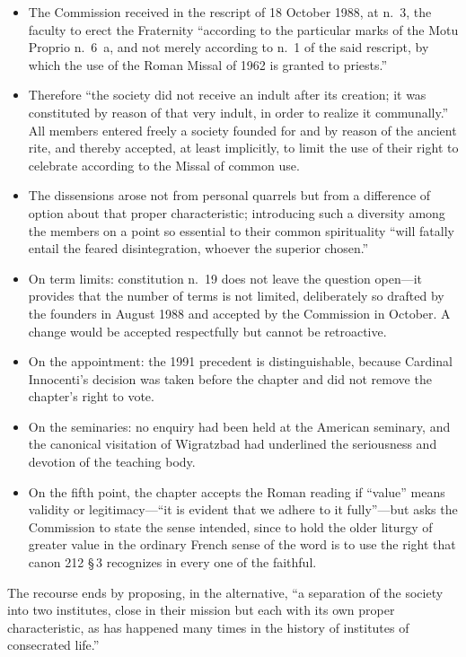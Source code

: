 \begin{itemize}
\item The Commission received in the rescript  of 18 October 1988, at n.~3, the faculty to erect the Fraternity
``according to the particular marks of the Motu Proprio  n.~6~a, and not merely according to n.~1 of the said rescript, by
which the use of the Roman Missal of 1962 is granted to priests.''
\item Therefore ``the society did not receive an indult after its
creation; it was constituted by reason of that very indult, in order to
realize it communally.'' All members entered freely a society founded for
and by reason of the ancient rite, and thereby accepted, at least
implicitly, to limit the use of their right to celebrate according to the
Missal of common use.
\item The dissensions arose not from personal quarrels but from a
difference of option about that proper characteristic; introducing such a
diversity among the members on a point so essential to their common
spirituality ``will fatally entail the feared disintegration, whoever the
superior chosen.''
\item On term limits: constitution n.~19 does not leave the question
open---it provides that the number of terms is not limited, deliberately so
drafted by the founders in August 1988 and accepted by the Commission in
October. A change would be accepted respectfully but cannot be
retroactive.
\item On the appointment: the 1991 precedent is distinguishable, because
Cardinal Innocenti's decision was taken before the chapter and did not
remove the chapter's right to vote.
\item On the seminaries: no enquiry had been held at the American
seminary, and the canonical visitation of Wigratzbad had underlined the
seriousness and devotion of the teaching body.
\item On the fifth point, the chapter accepts the Roman reading if
``value'' means validity or legitimacy---``it is evident that we adhere to
it fully''---but asks the Commission to state the sense intended, since to
hold the older liturgy of greater value in the ordinary French sense of
the word is to use the right that canon 212 §\,3 recognizes in every one
of the faithful.
\end{itemize}

The recourse ends by proposing, in the alternative, ``a separation of the
society into two institutes, close in their mission but each with its own
proper characteristic, as has happened many times in the history of
institutes of consecrated life.''

